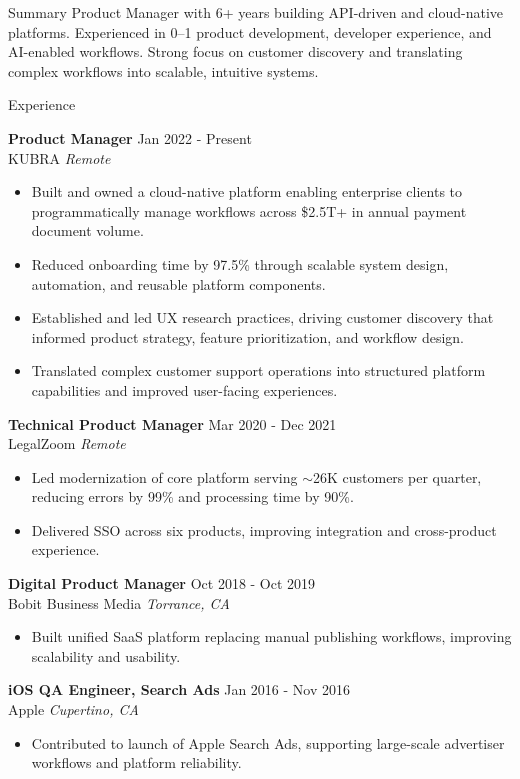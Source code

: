 \documentclass{resume}
\begin{document}
\begin{rSection}{Summary}
Product Manager with 6+ years building API-driven and cloud-native platforms. Experienced in 0–1 product development, developer experience, and AI-enabled workflows. Strong focus on customer discovery and translating complex workflows into scalable, intuitive systems.
\end{rSection}

\begin{rSection}{Experience}

\textbf{Product Manager} \hfill Jan 2022 - Present\\
KUBRA \hfill \textit{Remote}
\begin{itemize}
\itemsep -3pt
\item Built and owned a cloud-native platform enabling enterprise clients to programmatically manage workflows across \$2.5T+ in annual payment document volume.
\item Reduced onboarding time by 97.5\% through scalable system design, automation, and reusable platform components.
\item Established and led UX research practices, driving customer discovery that informed product strategy, feature prioritization, and workflow design.
\item Translated complex customer support operations into structured platform capabilities and improved user-facing experiences.
\end{itemize}

\textbf{Technical Product Manager} \hfill Mar 2020 - Dec 2021\\
LegalZoom \hfill \textit{Remote}
\begin{itemize}
\itemsep -3pt
\item Led modernization of core platform serving \(\sim\)26K customers per quarter, reducing errors by 99\% and processing time by 90\%.
\item Delivered SSO across six products, improving integration and cross-product experience.
\end{itemize}

\textbf{Digital Product Manager} \hfill Oct 2018 - Oct 2019\\
Bobit Business Media \hfill \textit{Torrance, CA}
\begin{itemize}
\itemsep -3pt
\item Built unified SaaS platform replacing manual publishing workflows, improving scalability and usability.
\end{itemize}

\textbf{iOS QA Engineer, Search Ads} \hfill Jan 2016 - Nov 2016\\
Apple \hfill \textit{Cupertino, CA}
\begin{itemize}
\itemsep -3pt
\item Contributed to launch of Apple Search Ads, supporting large-scale advertiser workflows and platform reliability.
\end{itemize}

\end{rSection}
\end{document}
